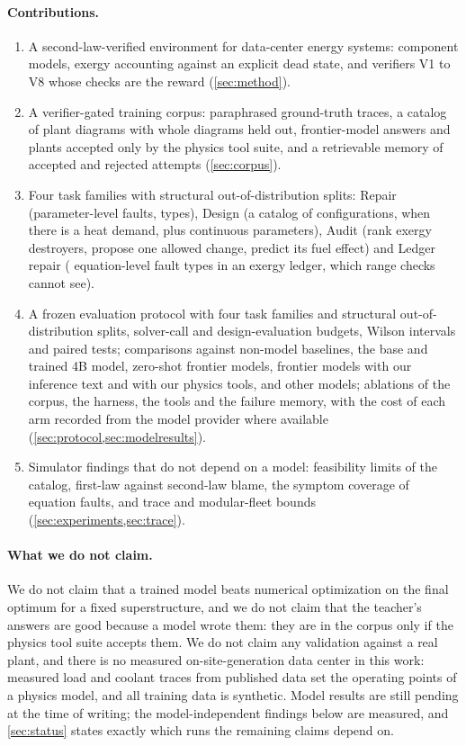 \paragraph{Contributions.}
\begin{enumerate}[leftmargin=*,itemsep=2pt]
\item A second-law-verified environment for data-center energy systems: 
component models, exergy accounting against an explicit dead state, and verifiers V1 to V8
whose checks are the reward (\cref{sec:method}).
\item A verifier-gated training corpus: paraphrased ground-truth traces, a catalog of  plant diagrams with whole diagrams held out, frontier-model answers and plants accepted only by the physics tool suite, and a retrievable memory of accepted and rejected attempts (\cref{sec:corpus}).
\item Four task families with structural out-of-distribution splits: Repair (parameter-level faults,
 types), Design (a catalog of  configurations,
 when there is a heat demand, plus continuous parameters), Audit (rank
exergy destroyers, propose one allowed change, predict its fuel effect) and Ledger repair
( equation-level fault types in an exergy ledger, which range checks cannot
see).
\item A frozen evaluation protocol with four task families and structural out-of-distribution splits, solver-call and design-evaluation budgets, Wilson intervals and paired tests; comparisons against non-model baselines, the base and trained 4B model, zero-shot frontier models, frontier models with our inference text and with our physics tools, and other models; ablations of the corpus, the harness, the tools and the failure memory, with the cost of each arm recorded from the model provider where available (\cref{sec:protocol,sec:modelresults}).
\item Simulator findings that do not depend on a model: feasibility limits of the catalog, first-law
against second-law blame, the symptom coverage of equation faults, and trace and modular-fleet bounds
(\cref{sec:experiments,sec:trace}).
\end{enumerate}

\paragraph{What we do not claim.}
We do not claim that a trained model beats numerical optimization on the final optimum for a fixed
superstructure, and we do not claim that the teacher's answers are good because a model wrote them: they are in the corpus only if the physics tool suite accepts them. We do not claim any validation against a real plant, and there is no measured
on-site-generation data center in this work: measured load and coolant traces from published data
set the operating points of a physics model, and all training data is synthetic. Model results are still pending at the time of writing; the model-independent findings below are measured, and \cref{sec:status} states exactly which runs the remaining claims depend on.

